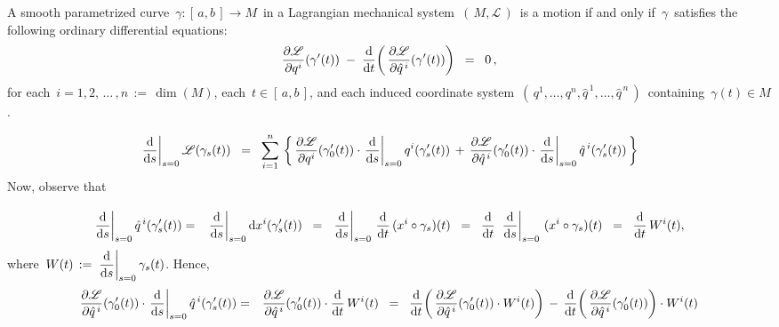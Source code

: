 \vskip 0.5cm
\begin{proposition}
\label{EulerLagrangeEquations}
\mbox{}
\vskip 0.1cm
\noindent
A smooth parametrized curve
\,$\gamma : [\,a,b\,] \longrightarrow M$\,
in a Lagrangian mechanical system
\,$\left(\,M,\mathscr{L}\,\right)$\,
is a motion if and only if
\,$\gamma$\,
satisfies the following ordinary differential equations:
\begin{equation*}
\dfrac{\partial\mathscr{L}}{\partial q^{i}}\!\left(\gamma^{\prime}(t)\right)
\; - \;
\dfrac{\textnormal{d}}{\textnormal{d} t}\!\left(\,\dfrac{\partial\mathscr{L}}{\partial \hat{q}^{\,i}}\!\left(\gamma^{\prime}(t)\right)\right)
\;\; = \;\;
0\,,
\end{equation*}
for each \,$i = 1, 2, \,\ldots\, , n \,:=\, \dim(M)$,
each \,$t \in [\,a,b\,]$, and
each induced coordinate system \,$\left(\,q^{1},\ldots,q^{n},\hat{q}^{\,1},\ldots,\hat{q}^{\,n}\,\right)$\,
containing \,$\gamma(t) \in M$.
\end{proposition}
\proof
\begin{equation}\label{VariationVectorField}
\left.\dfrac{\textnormal{d}}{\textnormal{d} s}\right\vert_{s=0} \mathscr{L}\!\left(\gamma_{s}(t)\right)
\;\; = \;\;
	\overset{n}{\underset{i=1}{\sum}}\,\left\{\,
		\dfrac{\partial\mathscr{L}}{\partial q^{i}}\!\left(\gamma^{\prime}_{0}(t)\right)
		\cdot
		\left.\dfrac{\textnormal{d}}{\textnormal{d} s}\right\vert_{s=0} q^{i}(\gamma^{\prime}_{s}(t))
		\, + \,
		\dfrac{\partial\mathscr{L}}{\partial\hat{q}^{\,i}}\!\left(\gamma^{\prime}_{0}(t)\right)
		\cdot
		\left.\dfrac{\textnormal{d}}{\textnormal{d} s}\right\vert_{s=0} \hat{q}^{\,i}(\gamma^{\prime}_{s}(t))
		\,\right\}
\end{equation}
Now, observe that
\begin{eqnarray*}
\left.\dfrac{\d}{\d s}\right\vert_{s=0} \hat{q}^{\,i}(\gamma^{\prime}_{s}(t))
& = &
	\left.\dfrac{\d}{\d s}\right\vert_{s=0} \d x^{i}(\gamma^{\prime}_{s}(t))
\;\; = \;\;
	\left.\dfrac{\d}{\d s}\right\vert_{s=0} \, \dfrac{\d}{\d t}\,(x^{i}\circ\gamma_{s})(t)
\;\; = \;\;
	\dfrac{\d}{\d t}\; \left.\dfrac{\d}{\d s}\right\vert_{s=0} \, (x^{i}\circ\gamma_{s})(t)
\;\; = \;\;
	\overset{{\color{white}1}}{\dfrac{\d}{\d t}}\, W^{i}(t),
\end{eqnarray*}
where
\,$W(t) \,:=\, \left.\dfrac{\textnormal{d}}{\textnormal{d} s}\right\vert_{s=0} \gamma_{s}(t)$.
Hence,
\begin{eqnarray*}
\dfrac{\partial\mathscr{L}}{\partial\hat{q}^{\,i}}\!\left(\gamma^{\prime}_{0}(t)\right)
\cdot
\left.\dfrac{\textnormal{d}}{\textnormal{d} s}\right\vert_{s=0} \hat{q}^{\,i}(\gamma^{\prime}_{s}(t))
& = &
	\dfrac{\partial\mathscr{L}}{\partial\hat{q}^{\,i}}\!\left(\gamma^{\prime}_{0}(t)\right)
	\cdot
	\dfrac{\textnormal{d}}{\textnormal{d} t}\, W^{i}(t)	
\;\; = \;\;
	\dfrac{\textnormal{d}}{\textnormal{d} t}\!\left(\,
		\dfrac{\partial\mathscr{L}}{\partial\hat{q}^{\,i}}\!\left(\gamma^{\prime}_{0}(t)\right)
		\cdot
		W^{i}(t)
		\right)
	\, - \,
	\dfrac{\textnormal{d}}{\textnormal{d} t}\!\left(\,
		\dfrac{\partial\mathscr{L}}{\partial\hat{q}^{\,i}}\!\left(\gamma^{\prime}_{0}(t)\right)
		\right)	
	\cdot
	W^{i}(t)
\end{eqnarray*}
